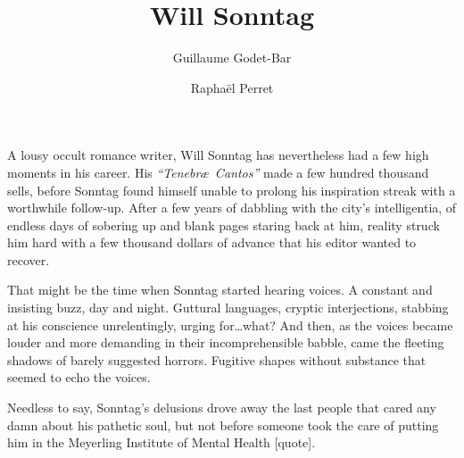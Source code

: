 \documentclass{rpg_player_character}
\title{Will Sonntag}
\begin{document}
\author{Guillaume Godet-Bar \and Rapha\"el Perret}
\maketitle

A lousy occult romance writer, Will Sonntag has nevertheless had a few high
moments in his career. His \emph{``Tenebr\ae\ Cantos''} made a few hundred
thousand sells, before Sonntag found himself unable to prolong his inspiration
streak with a worthwhile follow-up. After a few years of dabbling with the
city's intelligentia, of endless days of sobering up and blank pages staring
back at him, reality struck him hard with a few thousand dollars of advance
that his editor wanted to recover.

That might be the time when Sonntag started hearing voices. A constant and
insisting buzz, day and night. Guttural languages, cryptic interjections,
stabbing at his conscience unrelentingly, urging for\ldots what? And then,
as the voices became louder and more demanding in their incomprehensible
babble, came the fleeting shadows of barely suggested horrors. Fugitive shapes
without substance that seemed to echo the voices.

Needless to say, Sonntag's delusions drove away the last people that cared any
damn about his pathetic soul, but not before someone took the care of putting
him in the Meyerling Institute of Mental Health [quote].
\end{document}
